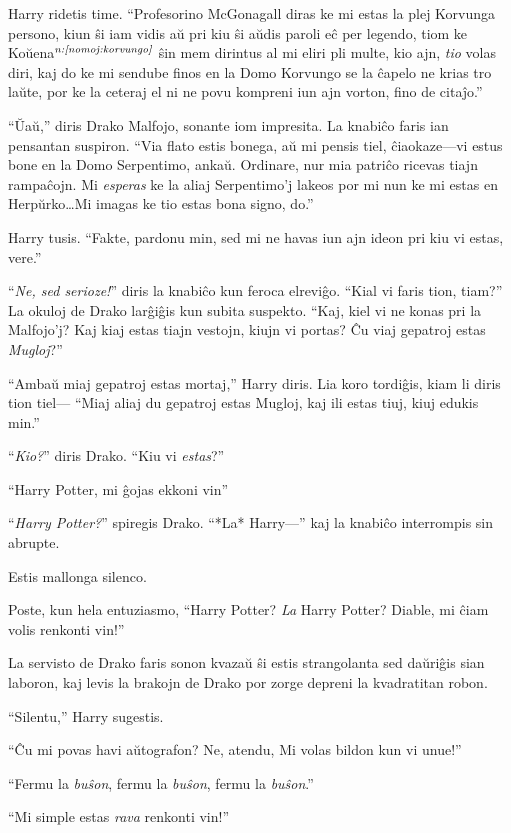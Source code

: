 Harry ridetis time. ``Profesorino McGonagall diras ke mi estas la
plej Korvunga persono, kiun ŝi iam vidis aŭ pri kiu ŝi aŭdis paroli eĉ
per legendo, tiom ke Koŭena$^{\textit{n:\ref{nomoj:korvungo}}}$ ŝin mem dirintus al mi eliri pli multe,
kio ajn, \emph{tio} volas diri, kaj do ke mi sendube finos en la Domo
Korvungo se la ĉapelo ne krias tro laŭte, por ke la ceteraj el ni ne
povu kompreni iun ajn vorton, fino de citaĵo.''

``Ŭaŭ,'' diris Drako Malfojo, sonante iom impresita. La knabiĉo faris
ian pensantan suspiron. ``Via flato estis bonega, aŭ mi pensis tiel,
ĉiaokaze—vi estus bone en la Domo Serpentimo, ankaŭ. Ordinare, nur mia
patriĉo ricevas tiajn rampaĉojn. Mi \emph{esperas} ke la aliaj
Serpentimo'j lakeos por mi nun ke mi estas en Herpŭrko\ldots Mi imagas
ke tio estas bona signo, do.''

Harry tusis. ``Fakte, pardonu min, sed mi ne havas iun ajn ideon pri
kiu vi estas, vere.''

``\emph{Ne, sed serioze!}'' diris la knabiĉo kun feroca elreviĝo. ``Kial
vi faris tion, tiam?'' La okuloj de Drako larĝiĝis kun subita
suspekto. ``Kaj, kiel vi ne konas pri la Malfojo'j? Kaj kiaj estas
tiajn vestojn, kiujn vi portas? Ĉu viaj gepatroj estas
\emph{Mugloj}?''

``Ambaŭ miaj gepatroj estas mortaj,'' Harry diris. Lia koro
tordiĝis, kiam li diris tion tiel— ``Miaj aliaj du gepatroj estas
Mugloj, kaj ili estas tiuj, kiuj edukis min.''

``\emph{Kio?}'' diris Drako. ``Kiu vi \emph{estas}?''

``Harry Potter, mi ĝojas ekkoni vin''

``\emph{Harry Potter?}'' spiregis Drako. ``*La* Harry—'' kaj la knabiĉo
interrompis sin abrupte.

Estis mallonga silenco.

Poste, kun hela entuziasmo, ``Harry Potter? \emph{La} Harry Potter?
Diable, mi ĉiam volis renkonti vin!''

La servisto de Drako faris sonon kvazaŭ ŝi estis strangolanta sed
daŭriĝis sian laboron, kaj levis la brakojn de Drako por zorge depreni
la kvadratitan robon.

``Silentu,'' Harry sugestis.

``Ĉu mi povas havi aŭtografon? Ne, atendu, Mi volas bildon kun vi
unue!''

``Fermu la \emph{buŝon}, fermu la \emph{buŝon}, fermu la \emph{buŝon}.''

``Mi simple estas \emph{rava} renkonti vin!''

